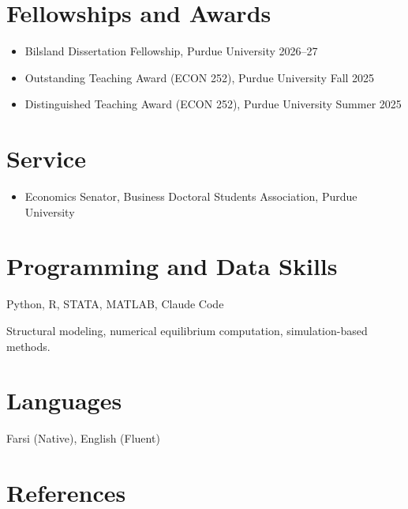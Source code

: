 \documentclass[11pt]{article}
\newenvironment{tight}
  {\begin{itemize}[leftmargin=1.2em,topsep=0.1em,itemsep=0.15em,parsep=0pt]}
  {\end{itemize}}
\begin{document}
\section{Fellowships and Awards}
\begin{tight}
  \item Bilsland Dissertation Fellowship, Purdue University \hfill 2026--27
  \item Outstanding Teaching Award (ECON 252), Purdue University \hfill Fall 2025
  \item Distinguished Teaching Award (ECON 252), Purdue University \hfill Summer 2025
\end{tight}

\section{Service}
\begin{tight}
  \item Economics Senator, Business Doctoral Students Association, Purdue University \hfill %
\end{tight}

\section{Programming and Data Skills}
Python, R, STATA, MATLAB, Claude Code\par\vspace{0.3em}
Structural modeling, numerical equilibrium computation, simulation-based methods.

\section{Languages}
Farsi (Native), English (Fluent)

\section{References}
\end{document}
